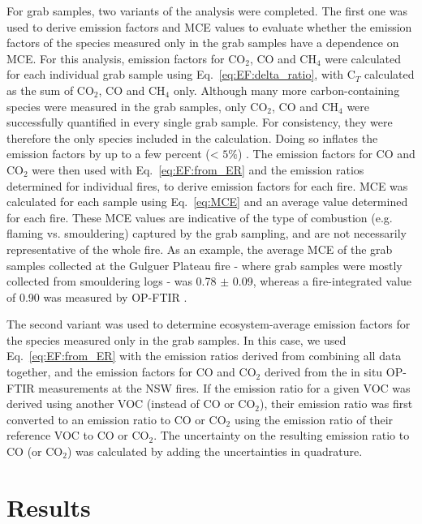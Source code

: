\documentclass[acp, manuscript]{copernicus}
\begin{document}
For grab samples, two variants of the analysis were completed. The first one was used to derive emission factors and MCE values to evaluate whether the emission factors of the species measured only in the grab samples have a dependence on MCE. For this analysis, emission factors for CO$_2$, CO and CH$_4$ were calculated for each individual grab sample using Eq.~\ref{eq:EF:delta_ratio}, with C$_T$ calculated as the sum of CO$_2$, CO and CH$_4$ only. Although many more carbon-containing species were measured in the grab samples, only CO$_2$, CO and CH$_4$ were successfully quantified in every single grab sample. For consistency, they were therefore the only species included in the calculation. Doing so inflates the emission factors by up to a few percent (< $5 \%$) \citep{Gilman2015,Yokelson2013}. The emission factors for CO and CO$_2$ were then used with Eq.~\ref{eq:EF:from_ER} and the emission ratios determined for individual fires, to derive emission factors for each fire. MCE was calculated for each sample using Eq.~\ref{eq:MCE} and an average value determined for each fire. These MCE values are indicative of the type of combustion (e.g. flaming vs. smouldering) captured by the grab sampling, and are not necessarily representative of the whole fire. As an example, the average MCE of the grab samples collected at the Gulguer Plateau fire - where grab samples were mostly collected from smouldering logs - was 0.78 $\pm$ 0.09, whereas a fire-integrated value of 0.90 was measured by OP-FTIR \citep{Paton-Walsh2014}.

The second variant was used to determine ecosystem-average emission factors for the species measured only in the grab samples. In this case, we used Eq.~\ref{eq:EF:from_ER} with the emission ratios derived from combining all data together, and the emission factors for CO and CO$_2$ derived from the in situ OP-FTIR measurements at the NSW fires. If the emission ratio for a given VOC was derived using another VOC (instead of CO or CO$_2$), their emission ratio was first converted to an emission ratio to CO or CO$_2$ using the emission ratio of their reference VOC to CO or CO$_2$. The uncertainty on the resulting emission ratio to CO (or CO$_2$) was calculated by adding the uncertainties in quadrature. 

 
\section{Results}
\end{document}
